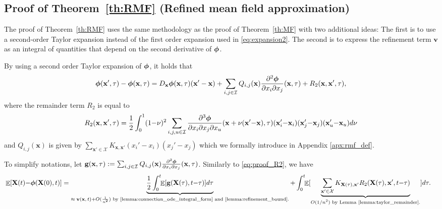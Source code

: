 \documentclass[acmsmall]{acmart}
\newcommand\bx{\mathbf{x}}
\newcommand\bX{\mathbf{X}}
\newcommand\bg{\mathbf{g}}
\newcommand\bv{\mathbf{v}}
\newcommand\bphi{\text{\boldmath$\phi$}}
\newcommand\calX{\mathcal{X}}
\newcommand\calI{\mathcal{I}}
\DeclareMathOperator{\E}{\mathbb{E}} %
\begin{document}

\subsection{Proof of Theorem~\ref{th:RMF} (Refined mean field approximation)}
\label{sec:proof_rmf}

The proof of Theorem~\ref{th:RMF} uses the same methodology as the proof of Theorem~\ref{th:MF} with two additional ideas: 
The first is to use a second-order Taylor expansion instead of the first order expansion used in \eqref{eq:expansion2}. The second is to express the refinement term $\bv$ as an integral of quantities that depend on the second derivative of $\bphi$.

By using a second order Taylor expansion of $\bphi$, it holds that
\begin{align}
  \label{eq:expansion3}
  \bphi(\bx',\tau) - \bphi(\bx, \tau) = D_\bx \bphi(\bx, \tau)(\bx'-\bx) + \sum_{i,j \in \calI} Q_{i,j}(\bx) \frac{\partial^2 \bphi}{\partial x_{i} \partial x_{j}} (\bx, \tau) +  R_2(\bx, \bx', \tau),
\end{align}
where the remainder term $R_2$ is equal to
\begin{align*}
  R_2(\bx,\bx',\tau)=\frac{1}{2} \int_0^1 (1{-}\nu)^2 \sum_{i,j,u\in\calI} \frac{\partial^3 \bphi}{\partial x_{i} \partial x_{j} \partial x_{u}} (\bx + \nu(\bx'{-}\bx) , \tau) (\bx'_i{-}\bx_i)(\bx'_j{-}\bx_j)(\bx'_u{-}\bx_u)d\nu
\end{align*} \color{myorange}
and $Q_{i,j}(\bx)$ is given by $\sum_{\bx' \in \calX} K_{\bx, \bx'}(x_i' - x_i)(x_j' - x_j) $ which we formally introduce in Appendix \ref{apx:rmf_def}. \color{black}

To simplify notations, let $\bg(\bx, \tau) := \sum_{i,j \in \calI} Q_{i,j}(\bx) \frac{\partial^2 \bphi}{\partial x_{i} \partial x_{j}} (\bx, \tau)$. Similarly to \eqref{eq:proof_R2}, we have
\begin{align}
  \label{eq:proof_R3}
& \E[\bX(t) {-} \bphi(\bX(0),t)]= \underbrace{\frac{1}{2}\int_0^t\!\! \E [ \bg(\bX(\tau),t{-}\tau)]d\tau}_{\text{$\approx \bv(\bx,t){+}O(\frac{1}{n^2})$ by \ref{lemma:connection_ode_integral_form} and \ref{lemma:refinement_bound}.}} + \int_0^t \!\!\E [ \underbrace{\sum_{\bx' \in \calX}K_{\bX(\tau),\bx'}R_2(\bX(\tau),\bx',t{-}\tau)}_{\text{$O(1/n^2)$ by Lemma~\ref{lemma:taylor_remainder}.}} ] d\tau.
\end{align}
\end{document}
